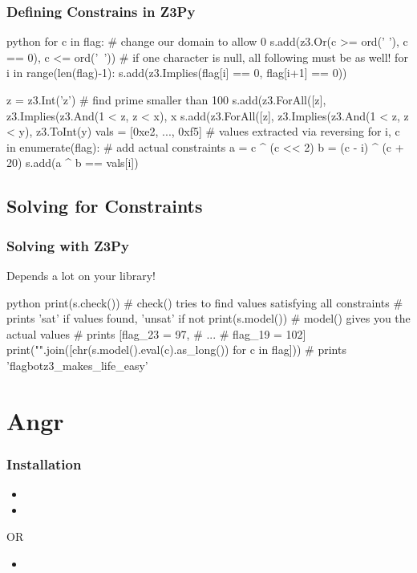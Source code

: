 \documentclass[aspectratio=169]{beamer}
\begin{document}
{\begin{frame}[fragile]
    \frametitle{Defining Constrains in Z3Py}
\begin{codebox}{python}
for c in flag: # change our domain to allow 0
    s.add(z3.Or(c >= ord(' '), c == 0), c <= ord('~'))
# if one character is null, all following must be as well!
for i in range(len(flag)-1):
    s.add(z3.Implies(flag[i] == 0, flag[i+1] == 0))

z = z3.Int('z') # find prime smaller than 100
s.add(z3.ForAll([z], z3.Implies(z3.And(1 < z, z < x), x %
s.add(z3.ForAll([z], z3.Implies(z3.And(1 < z, z < y),
    z3.ToInt(y) %
vals = [0xe2, ..., 0xf5] # values extracted via reversing
for i, c in enumerate(flag): # add actual constraints
    a = c ^ (c << 2)
    b = (c - i) ^ (c + 20)
    s.add(a ^ b == vals[i])
\end{codebox}
\end{frame}

\subsection{Solving for Constraints}

\begin{frame}[fragile]
    \frametitle{Solving with Z3Py}
    Depends a lot on your library!
\begin{codebox}{python}
print(s.check()) # check() tries to find values satisfying all constraints
# prints 'sat' if values found, 'unsat' if not
print(s.model()) # model() gives you the actual values
# prints [flag_23 = 97,
# ...
# flag_19 = 102]
print("".join([chr(s.model().eval(c).as_long()) for c in flag]))
# prints 'flagbot{z3_makes_life_easy}'
\end{codebox}

\end{frame}
}

\section{Angr}

\begin{frame}[fragile]
	\frametitle{Installation}
	\begin{itemize}
		\item {}
		\item {}
	\end{itemize}
	\vspace{1em}
	OR
	\vspace{1em}
	\begin{itemize}
		\item {}
	\end{itemize}
\end{frame}
\end{document}
